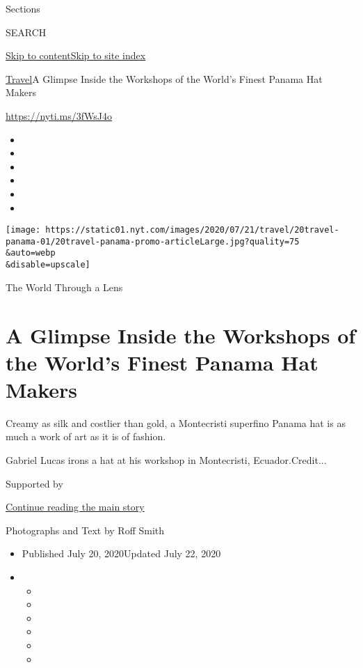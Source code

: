 Sections

SEARCH

\protect\hyperlink{site-content}{Skip to
content}\protect\hyperlink{site-index}{Skip to site index}

\href{/section/travel}{Travel}\textbar{}A Glimpse Inside the Workshops
of the World's Finest Panama Hat Makers

\url{https://nyti.ms/3fWsJ4o}

\begin{itemize}
\item
\item
\item
\item
\item
\item
\end{itemize}

\texttt{[image: https://static01.nyt.com/images/2020/07/21/travel/20travel-panama-01/20travel-panama-promo-articleLarge.jpg?quality=75\\\&auto=webp\\\&disable=upscale]}

The World Through a Lens

\hypertarget{a-glimpse-inside-the-workshops-of-the-worlds-finest-panama-hat-makers}{%
\section{A Glimpse Inside the Workshops of the World's Finest Panama Hat
Makers}\label{a-glimpse-inside-the-workshops-of-the-worlds-finest-panama-hat-makers}}

Creamy as silk and costlier than gold, a Montecristi superfino Panama
hat is as much a work of art as it is of fashion.

Gabriel Lucas irons a hat at his workshop in Montecristi,
Ecuador.Credit...

Supported by

\protect\hyperlink{after-sponsor}{Continue reading the main story}

Photographs and Text by Roff Smith

\begin{itemize}
\item
  Published July 20, 2020Updated July 22, 2020
\item
  \begin{itemize}
  \item
  \item
  \item
  \item
  \item
  \item
  \end{itemize}
\end{itemize}

